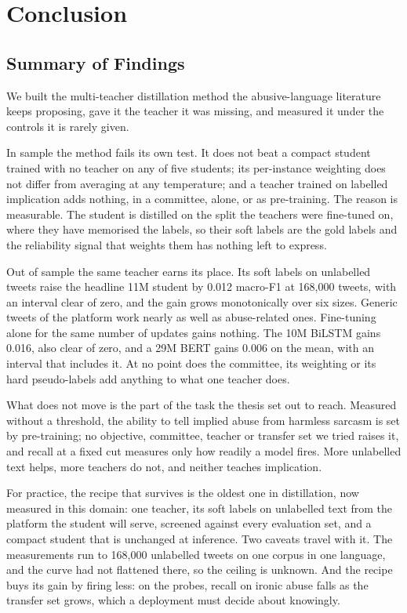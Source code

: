 \chapter{Conclusion}
\label{ch:6}
\section{Summary of Findings}
\label{sec:6.summary}
We built the multi-teacher distillation method the abusive-language literature keeps proposing, gave
it the teacher it was missing, and measured it under the controls it is rarely given.

In sample the method fails its own test. It does not beat a compact student trained with no teacher
on any of five students; its per-instance weighting does not differ from averaging at any
temperature; and a teacher trained on labelled implication adds nothing, in a committee, alone, or
as pre-training. The reason is measurable. The student is distilled on the split the teachers were
fine-tuned on, where they have memorised the labels, so their soft labels are the gold labels and
the reliability signal that weights them has nothing left to express.

Out of sample the same teacher earns its place. Its soft labels on unlabelled tweets raise the
headline 11M student by 0.012 macro-F1 at 168,000 tweets, with an interval clear of zero, and the
gain grows monotonically over six sizes. Generic tweets of the platform work nearly as well as
abuse-related ones. Fine-tuning alone for the same number of updates gains nothing. The 10M BiLSTM
gains 0.016, also clear of zero, and a 29M BERT gains 0.006 on the mean, with an interval that
includes it. At no point does the committee, its weighting or its hard pseudo-labels add anything to
what one teacher does.

What does not move is the part of the task the thesis set out to reach. Measured without a
threshold, the ability to tell implied abuse from harmless sarcasm is set by pre-training; no
objective, committee, teacher or transfer set we tried raises it, and recall at a fixed cut measures
only how readily a model fires. More unlabelled text helps, more teachers do not, and neither
teaches implication.

For practice, the recipe that survives is the oldest one in distillation, now measured in this
domain: one teacher, its soft labels on unlabelled text from the platform the student will serve,
screened against every evaluation set, and a compact student that is unchanged at inference. Two
caveats travel with it. The measurements run to 168,000 unlabelled tweets on one corpus in one
language, and the curve had not flattened there, so the ceiling is unknown. And the recipe buys its
gain by firing less: on the probes, recall on ironic abuse falls as the transfer set grows, which a
deployment must decide about knowingly.
